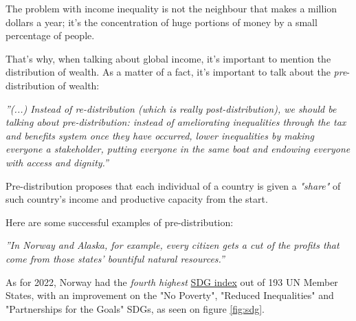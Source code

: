 \begin{enumerate}
The problem with income inequality is not the neighbour that makes a million dollars a year; it's the concentration of huge portions of money by a small percentage of people.

That's why, when talking about global income, it's important to mention the distribution of wealth. As a matter of a fact, it's important to talk about the \textit{pre}-distribution of wealth:

\begin{flushright}
   \textsl{''(...) Instead of \textit{re}-distribution (which is really ­\textit{post}-distribution), we should be talking about \textit{pre}-distribution: instead of ameliorating inequalities through the tax and benefits system once they have occurred, lower inequalities by making everyone a stakeholder, putting everyone in the same boat and endowing everyone with access and dignity.'' \cite{twp}} \\
\end{flushright}

\begin{comment}
    \vspace*{1cm}
        "Here’s how blockchain can reduce inequality", \href{https://www.washingtonpost.com/news/theworldpost/wp/2018/01/29/blockchain/}{The Washington Post}
\end{comment}

Pre-distribution proposes that each individual of a country is given a \textit{"share"} of such country's income and productive capacity from the start.

Here are some successful examples of pre-distribution:

\begin{flushright}
   \textsl{''In Norway and Alaska, for example, every citizen gets a cut of the profits that come from those states’ bountiful natural resources.'' \cite{twp}} \\

\end{flushright}

\begin{comment}
    \vspace*{1cm}
        "Here’s how blockchain can reduce inequality", \href{https://www.washingtonpost.com/news/theworldpost/wp/2018/01/29/blockchain/}{The Washington Post}
\end{comment}

As for 2022, Norway had the \textit{fourth highest} \href{https://dashboards.sdgindex.org/rankings}{SDG index} out of 193 UN Member States, with an improvement on the "No Poverty", "Reduced Inequalities" and "Partnerships for the Goals" SDGs, as seen on figure \ref{fig:sdg}.


\end{enumerate}
